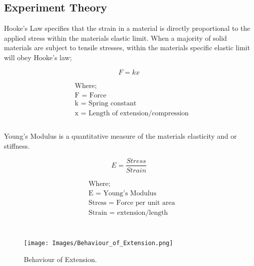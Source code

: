 \documentclass[11pt]{article}
\begin{document}
\begin{multicols}{2}
\subsection{Experiment Theory}
\label{Experiment Theory SubSection}

Hooke's Law specifies that the strain in a material is directly proportional to the applied stress within the materials elastic limit. When a majority of solid materials are subject to tensile stresses, within the materials specific elastic limit will obey Hooke's law;

\begin{equation} \label{Distance parallel to our line of sight equation}
{F = kx}
\end{equation}

\begin{equation*}
\begin{split}
&\text{Where;} \\
&\text{F = Force} \\
&\text{k = Spring constant} \\
&\text{x = Length of extension/compression} \\
\end{split}
\end{equation*}\\

Young's Modulus is a quantitative measure of the materials elasticity and or stiffness.

\begin{equation} \label{Distance parallel to our line of sight equation}
{E = \dfrac{Stress}{Strain}}
\end{equation}

\begin{equation*}
\begin{split}
&\text{Where;} \\
&\text{E = Young's Modulus} \\
&\text{Stress = Force per unit area} \\
&\text{Strain = extension/length} \\
\end{split}
\end{equation*}\\

\begin{figure}[H]
\centering
\texttt{[image: Images/Behaviour\_of\_Extension.png]}
\caption{Behaviour of Extension.}
\label{Behaviour_of_Extension}
\end{figure}


\end{multicols}
\end{document}
